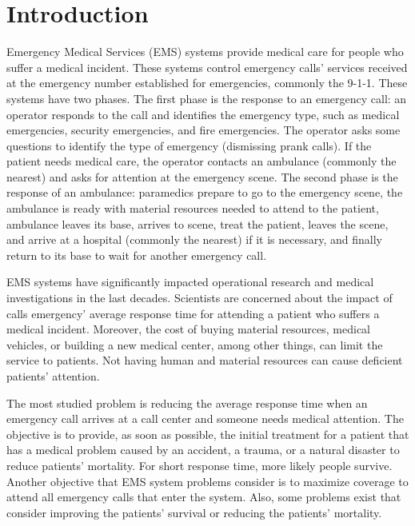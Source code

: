 %
\chapter{Introduction}

Emergency Medical Services (EMS) systems provide medical care for people who suffer a medical incident. These systems control emergency calls' services received at the emergency number established for emergencies, commonly the 9-1-1. These systems have two phases. The first phase is the response to an emergency call: an operator responds to the call and identifies the emergency type, such as medical emergencies, security emergencies, and fire emergencies. The operator asks some questions to identify the type of emergency (dismissing prank calls). If the patient needs medical care, the operator contacts an ambulance (commonly the nearest) and asks for attention at the emergency scene. The second phase is the response of an ambulance: paramedics prepare to go to the emergency scene, the ambulance is ready with material resources needed to attend to the patient, ambulance leaves its base, arrives to scene, treat the patient, leaves the scene, and arrive at a hospital (commonly the nearest) if it is necessary, and finally return to its base to wait for another emergency call.

EMS systems have significantly impacted operational research and medical investigations in the last decades. Scientists are concerned about the impact of calls emergency' average response time for attending a patient who suffers a medical incident. Moreover, the cost of buying material resources, medical vehicles, or building a new medical center, among other things, can limit the service to patients. Not having human and material resources can cause deficient patients' attention.

The most studied problem is reducing the average response time when an emergency call arrives at a call center and someone needs medical attention. 
The objective is to provide, as soon as possible, the initial treatment for a patient that has a medical problem caused by an accident, a trauma, or a natural disaster to reduce patients' mortality. For short response time, more likely people survive. Another objective that EMS system problems consider is to maximize coverage to attend all emergency calls that enter the system. Also, some problems exist that consider improving the patients' survival or reducing the patients' mortality. 

